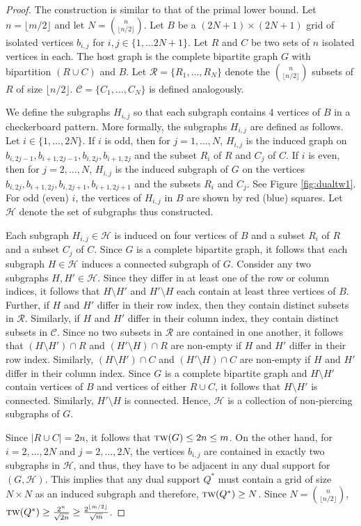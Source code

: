 \documentclass[12pt]{article}
\newcommand{\HH}{\mathcal{H}}
\newcommand{\tw}{\textsc{tw}}
\theoremstyle{case}
\begin{document}
\duallb*
\begin{proof}
The construction is similar to that of the primal lower bound. 
Let $n=\lfloor m/2\rfloor$ and let $N = \binom{n}{\lfloor n/2 \rfloor}$.
Let $B$ be a $(2N+1)\times (2N+1)$ grid of isolated vertices $b_{i,j}$ for $i,j\in\{1,\ldots 2N+1\}$. Let $R$ and $C$ be two
sets of $n$ isolated vertices in each.
The host graph is the complete bipartite graph $G$ with bipartition 
$(R\cup C)$ and $B$.
Let $\mathcal{R}=\{R_1,\ldots, R_N\}$ denote the $\binom{n}{\lfloor n/2 \rfloor}$ subsets of $R$ of size $\lfloor n/2 \rfloor$.
$\mathcal{C}=\{C_1,\ldots, C_N\}$ is defined analogously.

We define the subgraphs $H_{i,j}$ so that each subgraph contains 4 vertices of $B$ in a checkerboard pattern.
More formally, the subgraphs $H_{i,j}$ are defined as follows.
Let $i\in\{1,\ldots, 2N\}$.
If $i$ is odd, then for $j=1,\ldots, N$, $H_{i,j}$ is the induced graph on 
$b_{i,2j-1}, b_{i+1,2j-1}, b_{i,2j}, b_{i+1,2j}$ and the subset
$R_i$ of $R$  and $C_j$ of $C$.
If $i$ is even, then for $j=2,\ldots, N$,
$H_{i,j}$ is the induced subgraph of $G$ on the vertices
$b_{i,2j}, b_{i+1,2j}, b_{i,2j+1}, b_{i+1,2j+1}$ and the subsets $R_i$ and $C_j$.
See Figure \ref{fig:dualtw1}. For odd (even) $i$, the vertices of $H_{i,j}$ in $B$ are shown by red (blue) squares.
Let $\mathcal{H}$ denote the set of subgraphs thus constructed. 

Each subgraph $H_{i,j}\in\HH$ is induced on four vertices of $B$ and a subset $R_i$ of $R$ and a subset $C_j$ of $C$.
Since $G$ is a complete bipartite graph, it follows that each subgraph $H\in\mathcal{H}$ induces a connected
subgraph of $G$. Consider any two subgraphs $H, H'\in\mathcal{H}$. Since they differ in at least one of the row
or column indices, it follows that $H\setminus H'$ and $H'\setminus H$ each contain at least three 
vertices of $B$. Further, if $H$ and $H'$ differ in their row index, then they contain distinct
subsets in $\mathcal{R}$. Similarly, if $H$ and $H'$ differ in their column index, they contain distinct subsets in $\mathcal{C}$. Since no two subsets in $\mathcal{R}$ are contained in one another,
it follows that $(H\setminus H')\cap R$ and $(H'\setminus H)\cap R$ are non-empty if $H$ and $H'$ differ
in their row index. Similarly, $(H\setminus H')\cap C$ and $(H'\setminus H)\cap C$ are non-empty if
$H$ and $H'$ differ in their column index. Since $G$ is a complete bipartite graph and $H\setminus H'$
contain vertices of $B$ and vertices of either $R\cup C$, it follows that $H\setminus H'$ is
connected. Similarly, $H'\setminus H$ is connected. Hence, $\mathcal{H}$ is a collection of non-piercing
subgraphs of $G$.


Since $|R\cup C|=2n$, it follows that $\tw(G)\le 2n\le m$. On the
other hand, for $i=2,\ldots, 2N$ and $j=2,\ldots, 2N$, the vertices $b_{i,j}$ are contained in exactly two subgraphs in $\mathcal{H}$, and thus, they have to be adjacent in any dual support for $(G,\HH)$. This implies that any dual support $Q^*$ must
contain a grid of size $N\times N$ as an induced subgraph and therefore, $\tw(Q^*)\ge N$.
Since $N=\binom{n}{\lfloor n/2\rfloor}$, $\tw(Q^*)\ge \frac{2^{n}}{\sqrt{2n}} \ge \frac{2^{\lfloor m/2\rfloor}}{\sqrt{m}}$.
\end{proof}
\end{document}
